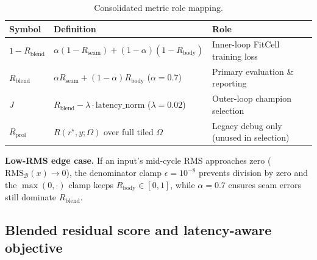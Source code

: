 \begin{table}[t]
  \centering
  \caption{Consolidated metric role mapping.}
  \label{tab:metric-roles}
  \setlength{\tabcolsep}{3pt}
  \footnotesize
  \begin{tabular}{@{}l>{\raggedright\arraybackslash}p{}>{\raggedright\arraybackslash}p{}@{}}
    \toprule
    Symbol & Definition & Role \\
    \midrule
    $1{-}R_{\mathrm{blend}}$ & $\alpha(1{-}R_{\mathrm{seam}}){+}(1{-}\alpha)(1{-}R_{\mathrm{body}})$ & Inner-loop FitCell training loss \\
    $R_{\mathrm{blend}}$ & $\alpha R_{\mathrm{seam}}{+}(1{-}\alpha)R_{\mathrm{body}}$ ($\alpha{=}0.7$) & Primary evaluation \& reporting \\
    $J$ & $R_{\mathrm{blend}}-\lambda\cdot\mathrm{latency\_norm}$ ($\lambda{=}0.02$) & Outer-loop champion selection \\
    $R_{\mathrm{prol}}$ & $R(r^{\star},y;\Omega)$ over full tiled $\Omega$ & Legacy debug only (unused in selection) \\
    \bottomrule
  \end{tabular}
\end{table}

\textbf{Low-RMS edge case.}
If an input's mid-cycle RMS approaches zero ($\mathrm{RMS}_{\mathcal{B}}(x)\to 0$), the denominator clamp $\epsilon{=}10^{-8}$ prevents division by zero and the $\max(0,\cdot)$ clamp keeps $R_{\mathrm{body}}\in[0,1]$, while $\alpha{=}0.7$ ensures seam errors still dominate $R_{\mathrm{blend}}$.

\subsection{Blended residual score and latency-aware objective}
\label{sec:residual-score}

